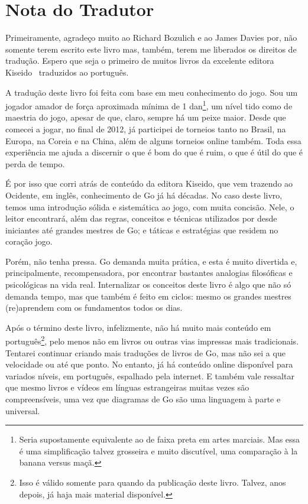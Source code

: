 \chapter{Nota do Tradutor}

Primeiramente, agradeço muito ao Richard Bozulich e ao James Davies por, não somente terem escrito este livro mas, também, terem me liberados os direitos de tradução. Espero que seja o primeiro de muitos livros da excelente editora Kiseido~\cite{kiseido} traduzidos ao português.


\bigskip

A tradução deste livro foi feita com base em meu conhecimento do jogo. Sou um jogador amador de força aproximada mínima de 1 dan\footnote{Seria supostamente equivalente ao de faixa preta em artes marciais. Mas essa é uma simplificação talvez grosseira e muito discutível, uma comparação à la banana versus maçã.}, um nível tido como de maestria do jogo, apesar de que, claro, sempre há um peixe maior. Desde que comecei a jogar, no final de 2012, já participei de torneios tanto no Brasil, na Europa, na Coreia e na China, além de alguns torneios online também. Toda essa experiência me ajuda a discernir o que é bom do que é ruim, o que é útil do que é perda de tempo.

É por isso que corri atrás de conteúdo da editora Kiseido, que vem trazendo ao Ocidente, em inglês, conhecimento de Go já há décadas. No caso deste livro, temos uma introdução sólida e sistemática ao jogo, com muita concisão. Nele, o leitor encontrará, além das regras, conceitos e técnicas utilizados por desde iniciantes até grandes mestres de Go; e táticas e estratégias que residem no coração jogo.

Porém, não tenha pressa. Go demanda muita prática, e esta é muito divertida e, principalmente, recompensadora, por encontrar bastantes analogias filosóficas e psicológicas na vida real. Internalizar os conceitos deste livro é algo que não só demanda tempo, mas que também é feito em ciclos: mesmo os grandes mestres (re)aprendem com os fundamentos todos os dias.

\pagebreak

Após o término deste livro, infelizmente, não há muito mais conteúdo em português\footnote{Isso é válido somente para quando da publicação deste livro. Talvez, anos depois, já haja mais material disponível.}, pelo menos não em livros ou outras vias impressas mais tradicionais. Tentarei continuar criando mais traduções de livros de Go, mas não sei a que velocidade ou até que ponto. No entanto, já há conteúdo online disponível para variados níveis, em português, espalhado pela internet. E também vale ressaltar que mesmo livros e vídeos em línguas estrangeiras muitas vezes são compreensíveis, uma vez que diagramas de Go são uma linguagem à parte e universal.

